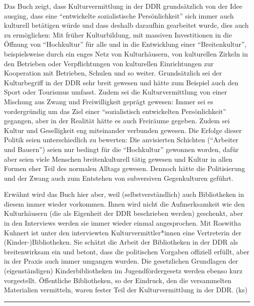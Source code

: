 \documentclass[a4paper,
fontsize=11pt,
oneside,
numbers=noperiodatend,
parskip=half-,
bibliography=totoc,
final
]{scrartcl}
\begin{document}
Das Buch zeigt, dass Kulturvermittlung in der DDR grundsätzlich von der
Idee ausging, dass eine \enquote{entwickelte sozialistische
Persönlichkeit} sich immer auch kulturell betätigen würde und dass
deshalb daraufhin gearbeitet wurde, dies auch zu ermöglichen: Mit früher
Kulturbildung, mit massiven Investitionen in die Öffnung von
\enquote{Hochkultur} für alle und in die Entwicklung einer
\enquote{Breitenkultur}, beispielsweise durch ein enges Netz von
Kulturhäusern, von kulturellen Zirkeln in den Betrieben oder
Verpflichtungen von kulturellen Einrichtungen zur Kooperation mit
Betrieben, Schulen und so weiter. Grundsätzlich sei der Kulturbegriff in
der DDR sehr breit gewesen und hätte zum Beispiel auch den Sport oder
Tourismus umfasst. Zudem sei die Kulturvermittlung von einer Mischung
aus Zwang und Freiwilligkeit geprägt gewesen: Immer sei es vordergründig
um das Ziel einer \enquote{sozialistisch entwickelten Persönlichkeit}
gegangen, aber in der Realität hätte es auch Freiräume gegeben. Zudem
sei Kultur und Geselligkeit eng miteinander verbunden gewesen. Die
Erfolge dieser Politik seien unterschiedlich zu bewerten: Die
anvisierten Schichten (\enquote{Arbeiter und Bauern}) seien nur bedingt
für die \enquote{Hochkultur} gewonnen worden, dafür aber seien viele
Menschen breitenkulturell tätig gewesen und Kultur in allen Formen eher
Teil des normalen Alltags gewesen. Dennoch hätte die Politisierung und
der Zwang auch zum Entstehen von subversiven Gegenkulturen geführt.

Erwähnt wird das Buch hier aber, weil (selbstverständlich) auch
Bibliotheken in diesem immer wieder vorkommen. Ihnen wird nicht die
Aufmerksamkeit wie den Kulturhäusern (die als Eigenheit der DDR
beschrieben werden) geschenkt, aber in den Interviews werden sie immer
wieder einmal angesprochen. Mit Roswitha Kuhnert ist unter den
interviewten Kulturvermittler*innen eine Vertreterin der
(Kinder-)Bibliotheken. Sie schätzt die Arbeit der Bibliotheken in der
DDR als breitenwirksam ein und betont, dass die politischen Vorgaben
offiziell erfüllt, aber in der Praxis auch immer umgangen wurden. Die
gesetzlichen Grundlagen der (eigenständigen) Kinderbibliotheken im
Jugendfördergesetz werden ebenso kurz vorgestellt. Öffentliche
Bibliotheken, so der Eindruck, den die versammelten Materialien
vermitteln, waren fester Teil der Kulturvermittlung in der DDR. (ks)

\begin{center}\rule{0.5\linewidth}{0.5pt}\end{center}
\end{document}
